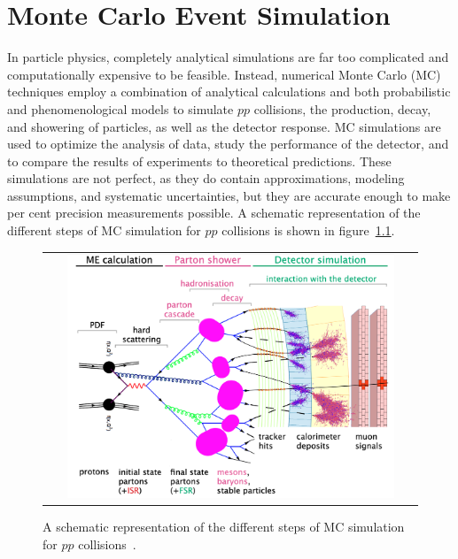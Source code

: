 
\chapter{Monte Carlo Event Simulation}
In particle physics, completely analytical simulations are far too complicated and computationally expensive to be feasible.
Instead, numerical Monte Carlo (MC) techniques employ a combination of analytical calculations and both probabilistic and phenomenological models to simulate $pp$ collisions, the production, decay, and showering of particles, as well as the detector response.
MC simulations are used to optimize the analysis of data, study the performance of the detector, and to compare the results of experiments to theoretical predictions.
These simulations are not perfect, as they do contain approximations, modeling assumptions, and systematic uncertainties, but they are accurate enough to make per cent precision measurements possible.
A schematic representation of the different steps of MC simulation for $pp$ collisions is shown in figure~\ref{MC_simulation}.
\begin{figure}[!h]
  \begin{center}
    \begin{tabular}{c}
        \includegraphics[width=0.9\textwidth]{fig_Event_Simulation/MC_simulation.png}
    \end{tabular}
    \caption{A schematic representation of the different steps of MC simulation for $pp$ collisions~\cite{bartosik}.
            }
    \label{MC_simulation}
  \end{center}
\end{figure}

